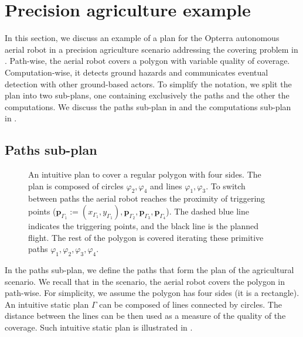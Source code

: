 \section{Precision agriculture example}
\label{sec:flight-plan}

In this section, we discuss an example of a plan for the Opterra autonomous aerial robot in a precision agriculture scenario addressing the covering problem in . Path-wise, the aerial robot covers a polygon with variable quality of coverage. Computation-wise, it detects ground hazards and communicates eventual detection with other ground-based actors. To simplify the notation, we split the plan into two sub-plans, one containing exclusively the paths and the other the computations. We discuss the paths sub-plan in  and the computations sub-plan in .

\subsection{Paths sub-plan}
\label{sec:path-wise}

\begin{figure}[h]
  \centering
  
  \caption[Intuitive plan to cover a regular polygon with four sides]{An intuitive plan to cover a regular polygon with four sides. The plan is composed of circles $\varphi_2,\varphi_4$ and lines $\varphi_1,\varphi_3$. To switch between paths the aerial robot reaches the proximity of triggering points ($\mathbf{p}_{\Gamma_1}:=(x_{\Gamma_1},y_{\Gamma_1}),\mathbf{p}_{\Gamma_2},\mathbf{p}_{\Gamma_3},\mathbf{p}_{\Gamma_4}$). The dashed blue line indicates the triggering points, and the black line is the planned flight. The rest of the polygon is covered iterating these primitive paths $\varphi_1,\varphi_2,\varphi_3,\varphi_4$.}
  \label{fig:plot3}
\end{figure}

In the paths sub-plan, we define the paths that form the plan of the agricultural scenario. We recall that in the scenario, the aerial robot covers the polygon in  path-wise. For simplicity, we assume the polygon has four sides (it is a rectangle). An intuitive static plan $\Gamma$ can be composed of lines connected by circles. The distance between the lines can be then used as a measure of the quality of the coverage. Such intuitive static plan is illustrated in .

